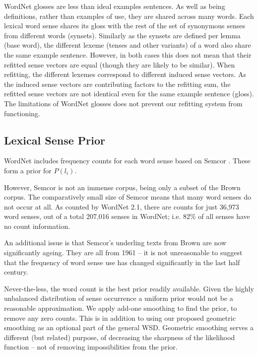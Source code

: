 \documentclass{article} %
\def\parencite{\cite} %
\providecommand{\DIFdel}[1]{{\protect\color{red}\sout{#1}}}                      %
\providecommand{\DIFaddbegin}{} %
\providecommand{\DIFaddend}{} %
\providecommand{\DIFdelbegin}{} %
\providecommand{\DIFdelend}{} %
\begin{document}
WordNet glosses are less than ideal examples sentences. As well as being definitions, rather than examples of use, they are shared across many words. Each lexical word sense shares its gloss with the rest of the set of synonymous senses from different words (synsets). Similarly as the synsets are defined per lemma (base word), the different lexeme (tenses and other variants) of a word also share the same example sentence. However, in both cases this does not mean that their refitted sense vectors are equal (though they are likely to be similar). When refitting, the different lexemes correspond to different induced sense vectors. As the induced sense vectors are contributing factors to the refitting sum, the refitted sense vectors are not identical even for the same example sentence (gloss). The limitations of WordNet glosses does not prevent our refitting system from functioning.

\subsection{Lexical Sense Prior}
WordNet includes frequency counts for each word sense based on Semcor \DIFdelbegin \DIFdel{\textcite{tengi1998design}}\DIFdelend \DIFaddbegin \parencite{tengi1998design}\DIFaddend . These form a prior for $P(l_i)$.

However, Semcor is not an immense corpus, being only a subset of the Brown corpus. The comparatively small size of Semcor means that many word senses do not occur at all. As counted by WordNet 2.1, there are counts for just  36,973 word senses, out of a total 207,016 senses in WordNet; i.e. 82\% of all senses have no count information.

An additional issue is that Semcor's underling texts from Brown are now significantly ageing. They are all from 1961 \cite{francis1979brown} -- it is not unreasonable to suggest that the frequency of word sense use has changed significantly in the last half century.

Never-the-less, the word count is the best prior readily available. Given the highly unbalanced distribution of sense occurrence a uniform prior would not be a reasonable approximation.
We apply add-one smoothing to find the prior, to remove any zero counts.
This is in addition to using our proposed geometric smoothing as an optional part of the general WSD.
Geometric smoothing serves a different (but related) purpose, of decreasing the sharpness of the likelihood function -- not of removing impossibilities from the prior.
\end{document}

